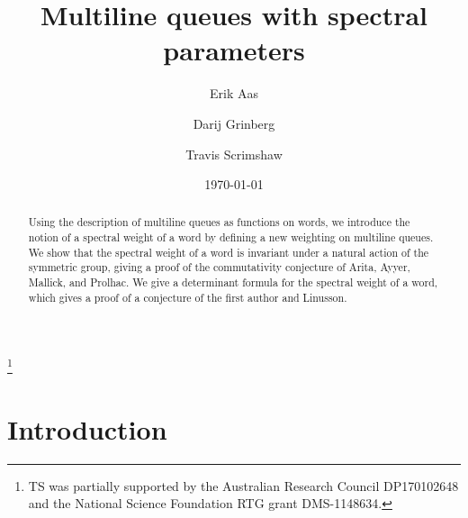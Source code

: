 \documentclass[reqno]{amsart}
\newcommand{\0}{\phantom{c}}
\theoremstyle{plain}
\theoremstyle{definition}
\numberwithin{equation}{section}
\begin{document}
\title[MLQs with spectral parameters]{Multiline queues with spectral parameters}

\author[E.~Aas]{Erik Aas}
\address[E. Aas]{Department of Mathematics, Pennsylvania State University, McAllister Building, State College, PA 16801, USA}

\author[D.~Grinberg]{Darij Grinberg}
\address[D. Grinberg]{School of Mathematics, University of Minnesota, 206 Church St. SE, Minneapolis, MN 55455}

\author[T.~Scrimshaw]{Travis Scrimshaw}
\address[T. Scrimshaw]{School of Mathematics and Physics, The University of Queensland, St.\ Lucia, QLD 4072, Australia}

\date{\today}


\thanks{TS was partially supported by the Australian Research Council DP170102648 and the National Science Foundation RTG grant DMS-1148634.}

\begin{abstract}
Using the description of multiline queues as functions on words, we introduce the notion of a spectral weight of a word by defining a new weighting on multiline queues.
We show that the spectral weight of a word is invariant under a natural action of the symmetric group, giving a proof of the commutativity conjecture of Arita, Ayyer, Mallick, and Prolhac.
We give a determinant formula for the spectral weight of a word, which gives a proof of a conjecture of the first author and Linusson.
\end{abstract}

\maketitle

\tableofcontents

\section{Introduction}
\label{sec:introduction}
\end{document}

